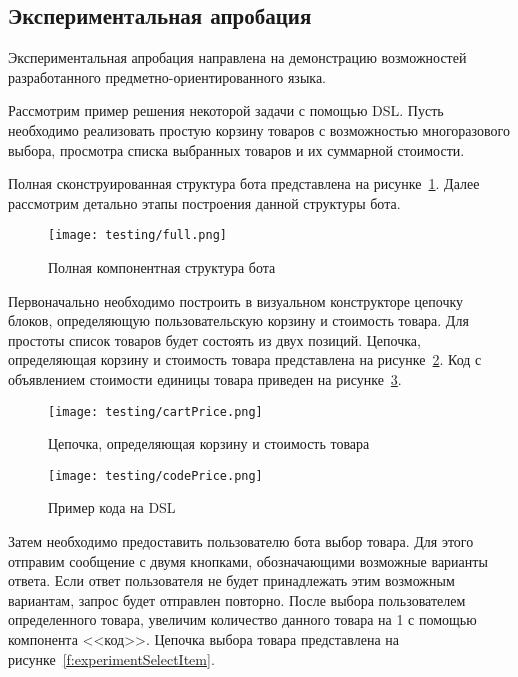 \subsection{Экспериментальная апробация}

Экспериментальная апробация направлена на демонстрацию возможностей разработанного предметно-ориентированного языка.

Рассмотрим пример решения некоторой задачи с помощью DSL.
Пусть необходимо реализовать простую корзину товаров с возможностью многоразового выбора, просмотра списка выбранных товаров и их суммарной стоимости.


Полная сконструированная структура бота представлена на рисунке~\ref{f:experimentFull}.
Далее рассмотрим детально этапы построения данной структуры бота.

\clearpage

\begin{figure}[!ht]
	\centering
	\texttt{[image: testing/full.png]}
	\caption{Полная компонентная структура бота}
	\label{f:experimentFull}
\end{figure}

Первоначально необходимо построить в визуальном конструкторе цепочку блоков, определяющую пользовательскую корзину и стоимость товара.
Для простоты список товаров будет состоять из двух позиций.
Цепочка, определяющая корзину и стоимость товара представлена на рисунке~\ref{f:experimentCartPrice}.
Код с объявлением стоимости единицы товара приведен на рисунке~\ref{f:experimentCodePrice}.

\begin{figure}[!ht]
	\centering
	\vspace{\toppaddingoffigure}
	\texttt{[image: testing/сartPrice.png]}
	\caption{Цепочка, определяющая корзину и стоимость товара}
	\label{f:experimentCartPrice}
\end{figure}

\clearpage

\begin{figure}[!ht]
	\centering
	\texttt{[image: testing/codePrice.png]}
	\caption{Пример кода на DSL}
	\label{f:experimentCodePrice}
\end{figure}

Затем необходимо предоставить пользователю бота выбор товара. Для этого отправим сообщение с двумя кнопками,
обозначающими возможные варианты ответа. Если ответ пользователя не будет принадлежать этим возможным вариантам, запрос будет отправлен повторно.
После выбора пользователем определенного товара, увеличим количество данного товара на 1 с помощью компонента <<код>>.
Цепочка выбора товара представлена на рисунке~\ref{f:experimentSelectItem}.

